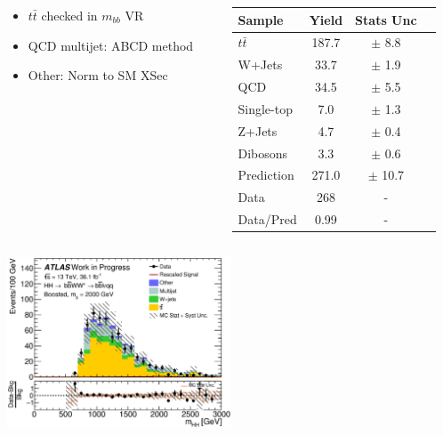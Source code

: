 \documentclass{beamer}
\newcommand*{\ttbar}{\ensuremath{t\bar{t}}\xspace}
\newcommand*{\header}[1]{\fontsize{16}{8}\selectfont \textbf{{\color{MyPurple}{#1}}}}
\begin{document}
\begin{frame}
\begin{center}
\header{Background Modeling}
\end{center}
{\color{MyPurple}{Similar to Boosted Analysis}}
\begin{columns}
\begin{column}{0.5\textwidth}
\vspace{-1cm}
\begin{itemize}
\item \ttbar checked in $m_{bb}$ VR
\item QCD multijet: ABCD method
\item Other: Norm to SM XSec
\end{itemize}
\end{column}
\begin{column}{0.5\textwidth}
\vspace{-0.9cm}
\begin{table}
\begin{center}
\scriptsize
\begin{tabular}{|l|c|c|c}
\hline
Sample        &  Yield   &  Stats Unc \\ 
\hline 
$t\bar{t}$    &  187.7  & $\pm$ 8.8    \\
W+Jets        &  33.7   & $\pm$ 1.9     \\
QCD           &  34.5   & $\pm$ 5.5     \\
Single-top    &  7.0   & $\pm$ 1.3     \\
Z+Jets        &  4.7    & $\pm$ 0.4        \\
Dibosons      &  3.3    & $\pm$ 0.6      \\
\hline
Prediction    &  271.0  & $\pm$ 10.7       \\
Data          &  268    & - \\
\hline
Data/Pred     &  0.99    & -  \\
\hline
\end{tabular}
\end{center}
\end{table}
\end{column}
\end{columns}
\begin{center}
\vspace{-0.4cm}
\includegraphics[width=0.5\textwidth]{figures/C_2tag_mbbcr_lepton_presel_met50_hhMassRebin1}
\end{center}
\end{frame}
\end{document}

